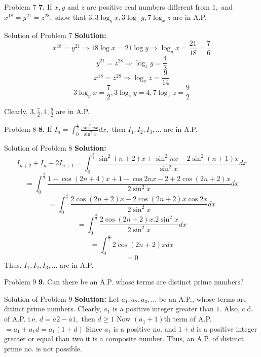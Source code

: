 \documentclass[aspectratio=1610,8pt]{beamer}
\begin{document}
\begin{frame}{Problem 7}
  \textbf{7.} If $x, y$ and $z$ are positive real numbers different from $1,$ and $x^{18} = y^{21} = z^{28},$ show that $3, 3\log_y
  x, 3\log_z y, 7\log_x z$ are in A.P.
\end{frame}
\begin{frame}{Solution of Problem 7}
  \textbf{Solution:} $$x^{18} = y^{21}\Rightarrow 18\log x = 21\log y \Rightarrow \log_y x = \frac{21}{18} = \frac{7}{6}$$
  $$y^{21} = z^{28} \Rightarrow \log_z y = \frac{4}{3}$$
  $$x^{18} = z^{28} \Rightarrow \log_x z = \frac{9}{14}$$
  $$3\log_y x = \frac{7}{2}, 3\log_z y = 4, 7\log_x z = \frac{9}{2}$$

  Clearly, $3, \frac{7}{2}, 4, \frac{9}{2}$ are in A.P.
\end{frame}
\begin{frame}{Problem 8}
  \textbf{8.} If $I_n = \int_{0}^{\frac{\pi}{2}}\frac{\sin^2nx}{\sin^2x}dx,$ then $I_1, I_2, I_3, \ldots$ are in A.P.
\end{frame}
\begin{frame}{Solution of Problem 8}
  \textbf{Solution:} $$I_{n + 2} + I_n - 2I_{n + 1} = \int_{0}^{\frac{\pi}{2}}\frac{\sin^2(n + 2)x + \sin^2nx - 2\sin^2(n +
    1)x}{\sin^2x}dx$$
  $$= \int_{0}^{\frac{\pi}{2}}\frac{1 - \cos(2n + 4)x + 1 - \cos 2nx - 2 + 2\cos(2n + 2)x}{2\sin^2x}dx$$
  $$= \int_{0}^{\frac{\pi}{2}}\frac{2\cos(2n + 2)x - 2\cos(2n + 2)x\cos 2x}{2\sin^2x}dx$$
  $$= \int_{0}^{\frac{\pi}{2}}\frac{2\cos(2n + 2)x.2\sin^2x}{2\sin^2x}dx$$
  $$= \int_{0}^{\frac{\pi}{2}}2\cos(2n + 2)x dx$$
  $$= 0$$
  Thus, $I_1, I_2, I_3, \ldots$ are in A.P.
\end{frame}
\begin{frame}{Problem 9}
  \textbf{9.} Can there be an A.P. whose terms are distinct prime numbers?
\end{frame}
\begin{frame}{Solution of Problem 9}
  \textbf{Solution:} Let $a_1, a_2, a_3, \ldots$ be an A.P., whose terms are ditinct prime numbers.
  \linebreak\linebreak
  Clearly, $a_1$ is a positive integer greater than $1.$
  \linebreak\linebreak
  Also, c.d. of A.P. i.e. $d = a2 - a1,$ then $d\geq 1$
  \linebreak\linebreak
  Now $(a_1 + 1)$th term of A.P. $= a_1 + a_1d = a_1(1 + d)$
  \linebreak\linebreak
  Since $a_1$ is a positive no. and $1 + d$ is a positive integer greater or equal than two it is a composite number. Thus, an
  A.P. of distinct prime no. is not possible.
\end{frame}
\end{document}
